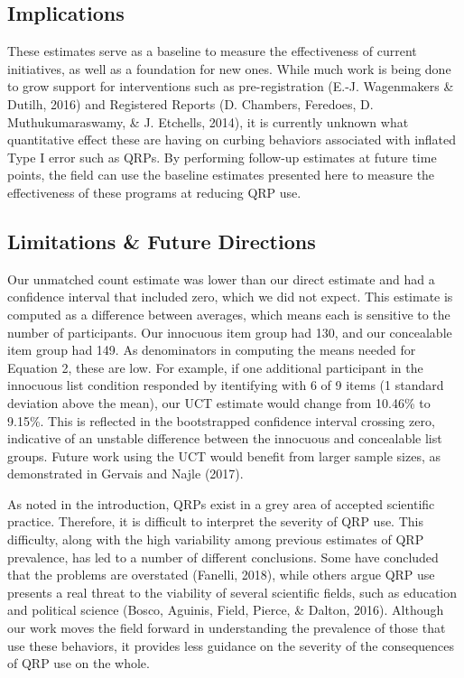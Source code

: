 \documentclass[jou]{apa6}
\theoremstyle{definition}
\theoremstyle{definition}
\theoremstyle{definition}
\theoremstyle{remark}
\begin{document}
\subsection{Implications}\label{implications}

These estimates serve as a baseline to measure the effectiveness of
current initiatives, as well as a foundation for new ones. While much
work is being done to grow support for interventions such as
pre-registration (E.-J. Wagenmakers \& Dutilh, 2016) and Registered
Reports (D. Chambers, Feredoes, D. Muthukumaraswamy, \& J. Etchells,
2014), it is currently unknown what quantitative effect these are having
on curbing behaviors associated with inflated Type I error such as QRPs.
By performing follow-up estimates at future time points, the field can
use the baseline estimates presented here to measure the effectiveness
of these programs at reducing QRP use.

\subsection{Limitations \& Future
Directions}\label{limitations-future-directions}

Our unmatched count estimate was lower than our direct estimate and had
a confidence interval that included zero, which we did not expect. This
estimate is computed as a difference between averages, which means each
is sensitive to the number of participants. Our innocuous item group had
130, and our concealable item group had 149. As denominators in
computing the means needed for Equation 2, these are low. For example,
if one additional participant in the innocuous list condition responded
by itentifying with 6 of 9 items (1 standard deviation above the mean),
our UCT estimate would change from 10.46\% to 9.15\%. This is reflected
in the bootstrapped confidence interval crossing zero, indicative of an
unstable difference between the innocuous and concealable list groups.
Future work using the UCT would benefit from larger sample sizes, as
demonstrated in Gervais and Najle (2017).

As noted in the introduction, QRPs exist in a grey area of accepted
scientific practice. Therefore, it is difficult to interpret the
severity of QRP use. This difficulty, along with the high variability
among previous estimates of QRP prevalence, has led to a number of
different conclusions. Some have concluded that the problems are
overstated (Fanelli, 2018), while others argue QRP use presents a real
threat to the viability of several scientific fields, such as education
and political science (Bosco, Aguinis, Field, Pierce, \& Dalton, 2016).
Although our work moves the field forward in understanding the
prevalence of those that use these behaviors, it provides less guidance
on the severity of the consequences of QRP use on the whole.
\end{document}
